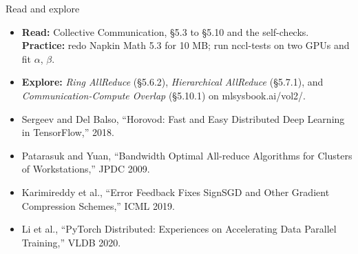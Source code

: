 \documentclass[aspectratio=169, 12pt]{beamer}
\begin{document}
\begin{frame}{Read and explore}
  \footnotesize
  \begin{itemize}\setlength{\itemsep}{0.08cm}
    \item \textbf{Read:} Collective Communication, \S5.3 to \S5.10 and the self-checks. \textbf{Practice:} redo Napkin Math 5.3 for 10 MB; run nccl-tests on two GPUs and fit $\alpha$, $\beta$.
    \item \textbf{Explore:} \emph{Ring AllReduce} (\S5.6.2), \emph{Hierarchical AllReduce} (\S5.7.1), and \emph{Communication-Compute Overlap} (\S5.10.1) on mlsysbook.ai/vol2/.
    \item Sergeev and Del Balso, ``Horovod: Fast and Easy Distributed Deep Learning in TensorFlow,'' 2018.
    \item Patarasuk and Yuan, ``Bandwidth Optimal All-reduce Algorithms for Clusters of Workstations,'' JPDC 2009.
    \item Karimireddy et al., ``Error Feedback Fixes SignSGD and Other Gradient Compression Schemes,'' ICML 2019.
    \item Li et al., ``PyTorch Distributed: Experiences on Accelerating Data Parallel Training,'' VLDB 2020.
  \end{itemize}
\end{frame}
\end{document}
